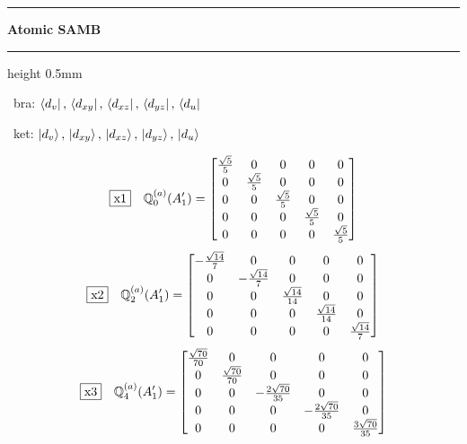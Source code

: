 \documentclass[fleqn,10pt,landscape]{jsarticle}
\begin{document}
\vspace{5mm}
\noindent \rule[0.5mm]{5mm}{0.5mm}\hspace{3mm}\textbf{Atomic SAMB}\hspace{3mm}\leaders\hrule height 0.5mm\hfill\kern0pt
\vspace{3mm}

\vspace{5mm}

\noindent\textbullet\, bra: $\bra{d_{v}},\, \bra{d_{xy}},\, \bra{d_{xz}},\, \bra{d_{yz}},\, \bra{d_{u}}$

\noindent\textbullet\, ket: $\ket{d_{v}},\, \ket{d_{xy}},\, \ket{d_{xz}},\, \ket{d_{yz}},\, \ket{d_{u}}$

\begin{dmath*}
\fbox{x1}\quad \mathbb{Q}_{0}^{(a)}(A_{1}^{\prime})=\begin{bmatrix} \frac{\sqrt{5}}{5} & 0 & 0 & 0 & 0 \\ 0 & \frac{\sqrt{5}}{5} & 0 & 0 & 0 \\ 0 & 0 & \frac{\sqrt{5}}{5} & 0 & 0 \\ 0 & 0 & 0 & \frac{\sqrt{5}}{5} & 0 \\ 0 & 0 & 0 & 0 & \frac{\sqrt{5}}{5} \end{bmatrix}
\end{dmath*}
\begin{dmath*}
\fbox{x2}\quad \mathbb{Q}_{2}^{(a)}(A_{1}^{\prime})=\begin{bmatrix} - \frac{\sqrt{14}}{7} & 0 & 0 & 0 & 0 \\ 0 & - \frac{\sqrt{14}}{7} & 0 & 0 & 0 \\ 0 & 0 & \frac{\sqrt{14}}{14} & 0 & 0 \\ 0 & 0 & 0 & \frac{\sqrt{14}}{14} & 0 \\ 0 & 0 & 0 & 0 & \frac{\sqrt{14}}{7} \end{bmatrix}
\end{dmath*}
\begin{dmath*}
\fbox{x3}\quad \mathbb{Q}_{4}^{(a)}(A_{1}^{\prime})=\begin{bmatrix} \frac{\sqrt{70}}{70} & 0 & 0 & 0 & 0 \\ 0 & \frac{\sqrt{70}}{70} & 0 & 0 & 0 \\ 0 & 0 & - \frac{2 \sqrt{70}}{35} & 0 & 0 \\ 0 & 0 & 0 & - \frac{2 \sqrt{70}}{35} & 0 \\ 0 & 0 & 0 & 0 & \frac{3 \sqrt{70}}{35} \end{bmatrix}
\end{dmath*}
\end{document}
